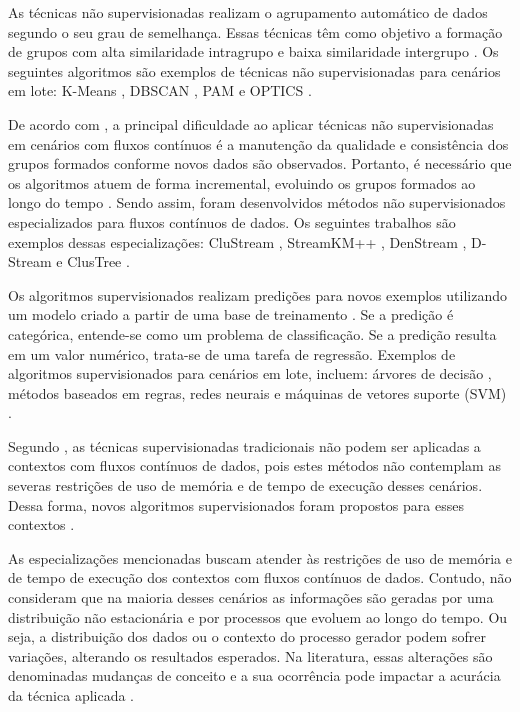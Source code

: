 \documentclass[qual, classic, a4paper]{ufbathesis}
\begin{document}
As técnicas não supervisionadas realizam o agrupamento automático de dados segundo o seu grau de semelhança.
Essas técnicas têm como objetivo a formação de grupos com alta similaridade intragrupo e baixa similaridade intergrupo \cite{Jain:1988:ACD:46712}.
Os seguintes algoritmos são exemplos de técnicas não supervisionadas para cenários em lote:
K-Means \cite{Lloyd:2006:LSQ:2263356.2269955},
DBSCAN \cite{Ester:1996:DAD:3001460.3001507},
PAM \cite{kaufman:clustering1990} e 
OPTICS \cite{Ankerst:1999:OOP:304181.304187}.

De acordo com , a principal dificuldade ao aplicar técnicas não supervisionadas em cenários com fluxos contínuos é a manutenção da qualidade e consistência dos grupos formados conforme novos dados são observados.
Portanto, é necessário que os algoritmos atuem de forma incremental, evoluindo os grupos formados ao longo do tempo \cite{Barbara:2002:RCD:507515.507519}.
Sendo assim, foram desenvolvidos métodos não supervisionados especializados para fluxos contínuos de dados.
Os seguintes trabalhos são exemplos dessas especializações:
CluStream \cite{Aggarwal:2003:FCE:1315451.1315460},
StreamKM++ \cite{Ackermann:2012:SCA:2133803.2184450},
DenStream \cite{Cao:Feng:Ester},
D-Stream \cite{Chen:Tu} e ClusTree \cite{Kranen:2011:CIM:2134350.2134352}.

Os algoritmos supervisionados realizam predições para novos exemplos utilizando um modelo criado a partir de uma base de treinamento \cite{Kotsiantis:2007:SML:1566770.1566773}.
Se a predição é categórica, entende-se como um problema de classificação.
Se a predição resulta em um valor numérico, trata-se de uma tarefa de regressão.
Exemplos de algoritmos supervisionados para cenários em lote, incluem:
árvores de decisão \cite{Breiman:Classification_Regression_Trees},
métodos baseados em regras, 
redes neurais e máquinas de vetores suporte (SVM) \cite{Vapnik1998}.

Segundo , 
as técnicas supervisionadas tradicionais não podem ser aplicadas a contextos com fluxos contínuos de dados, 
pois estes métodos não contemplam as severas restrições de uso de memória e de tempo de execução desses cenários.
%
Dessa forma, 
novos algoritmos supervisionados foram propostos para esses contextos \cite{Domingos:2000:MHD:347090.347107, Bifet:2013:EDS:2480362.2480516, Wang:2003:MCD:956750.956778, Aggarwal:2004:DCD:1014052.1014110, Gama:2003:ADT:956750.956813}.

As especializações mencionadas buscam atender às restrições de uso de memória e de tempo de execução dos contextos com fluxos contínuos de dados.
Contudo, não consideram que na maioria desses cenários as informações são geradas por uma distribuição não estacionária e por processos que evoluem ao longo do tempo.
Ou seja, a distribuição dos dados ou o contexto do processo gerador podem sofrer variações, alterando os resultados esperados.
Na literatura, essas alterações são denominadas mudanças de conceito e a sua ocorrência pode impactar a acurácia da técnica aplicada \cite{Gama:2010:KDD:1855075}.
\end{document}
